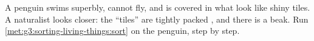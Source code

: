 \begin{exercise}[$\star\star$]\label{exo:g3:sorting-living-things:10}
A penguin swims superbly, cannot fly, and is covered in what look
like shiny tiles. A naturalist looks closer: the ``tiles'' are
tightly packed , and there is a beak. Run
\cref{met:g3:sorting-living-things:sort} on the penguin, step by
step.
\end{exercise}
